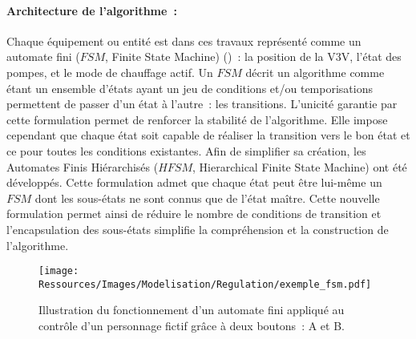 \paragraph{Architecture de l’algorithme~:} %
\label{par:architecture_de_l_algorithme}
Chaque équipement ou entité est dans ces travaux représenté comme un automate fini ($FSM$,
Finite State Machine) ()~: la position de la V3V, l’état des
pompes, et le mode de chauffage actif. Un $FSM$ décrit un algorithme comme étant un
ensemble d’états ayant un jeu de conditions et/ou temporisations permettent de passer d’un
état à l’autre~: les transitions. L’unicité garantie par cette formulation permet de
renforcer la stabilité de l’algorithme. Elle impose cependant que chaque état soit capable
de réaliser la transition vers le bon état et ce pour toutes les conditions existantes.
Afin de simplifier sa création, les Automates Finis Hiérarchisés ($HFSM$, Hierarchical
Finite State Machine) ont été développés. Cette formulation admet que chaque état peut
être lui-même un $FSM$ dont les sous-états ne sont connus que de l’état maître. Cette
nouvelle formulation permet ainsi de réduire le nombre de conditions de transition et
l’encapsulation des sous-états simplifie la compréhension et la construction de
l’algorithme.

\begin{figure}
    \centering
    \texttt{[image: Ressources/Images/Modelisation/Regulation/exemple\_fsm.pdf]}
    \caption{Illustration du fonctionnement d’un automate fini appliqué au contrôle
             d’un personnage fictif grâce à deux boutons~: A et B.}
    \label{fig:automate_fini}
\end{figure}

